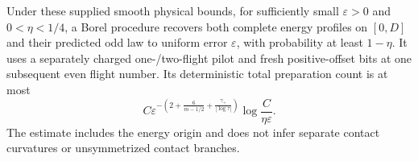 \begin{theorem}
\label{thm:v12-self-calibrated}
Under these supplied smooth physical bounds, for sufficiently small
$\varepsilon>0$ and $0<\eta<1/4$, a Borel procedure recovers
both complete energy profiles on $[0,D]$ and their predicted odd
law to uniform error $\varepsilon$, with probability at least
$1-\eta$. It uses a separately charged one-/two-flight pilot and
fresh positive-offset bits at one subsequent even flight number.
Its deterministic total preparation count is at most
\begin{equation}\label{eq:v12-self-rate}
 C\varepsilon^{-\left(2+\frac6{m-1/2}
                              +\frac{\gamma_+}{|\log\tau|}\right)}
                                 \log\frac{C}{\eta\varepsilon}.
\end{equation}
The estimate includes the energy origin and does not infer separate
contact curvatures or unsymmetrized contact branches.
\end{theorem}
